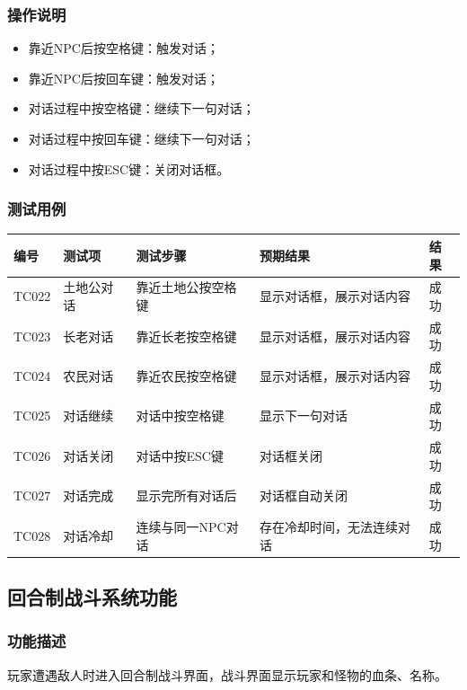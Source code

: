 \documentclass[a4paper,12pt]{article}
\begin{document}
\subsubsection{操作说明}
\begin{itemize}[leftmargin=2em]
    \item 靠近NPC后按空格键：触发对话；
    \item 靠近NPC后按回车键：触发对话；
    \item 对话过程中按空格键：继续下一句对话；
    \item 对话过程中按回车键：继续下一句对话；
    \item 对话过程中按ESC键：关闭对话框。
\end{itemize}

\subsubsection{测试用例}
\begin{longtable}{p{1.2cm} p{2.8cm} p{4cm} p{3.5cm} p{1.5cm}}
\toprule
\textbf{编号} & \textbf{测试项} & \textbf{测试步骤} & \textbf{预期结果} & \textbf{结果} \\
\midrule
\endhead
TC022 & 土地公对话 & 靠近土地公按空格键 & 显示对话框，展示对话内容 & 成功 \\
TC023 & 长老对话 & 靠近长老按空格键 & 显示对话框，展示对话内容 & 成功 \\
TC024 & 农民对话 & 靠近农民按空格键 & 显示对话框，展示对话内容 & 成功 \\
TC025 & 对话继续 & 对话中按空格键 & 显示下一句对话 & 成功 \\
TC026 & 对话关闭 & 对话中按ESC键 & 对话框关闭 & 成功 \\
TC027 & 对话完成 & 显示完所有对话后 & 对话框自动关闭 & 成功 \\
TC028 & 对话冷却 & 连续与同一NPC对话 & 存在冷却时间，无法连续对话 & 成功 \\
\bottomrule
\end{longtable}

\subsection{回合制战斗系统功能}

\subsubsection{功能描述}
玩家遭遇敌人时进入回合制战斗界面，战斗界面显示玩家和怪物的血条、名称。
\end{document}
